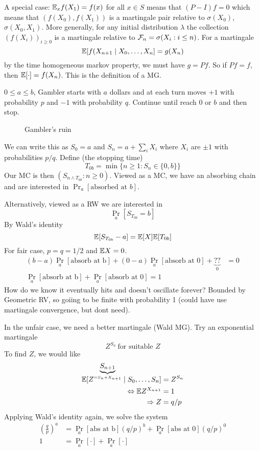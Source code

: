 A special case: $\mathbb{E}_x f(X_1) = f(x)$ for all
$x \in S$ means that $(P - I) f = 0$ which means
that $(f(X_0), f(X_1))$ is a martingale
pair relative to $\sigma(X_0)$, $\sigma(X_0, X_1)$.
More generally, for any initial distribution $\lambda$ the collection $(f(X_i))_{i \geq 0}$
is
a martingale relative to $\mathcal{F}_n = \sigma(X_i : i \leq n)$. For a martingale
\[
  \mathbb{E}[f(X_{n+1} \mid X_0, \ldots, X_n] = g(X_n)
\]
by the time homogeneous markov property, we must
have $g = P f$. So if $P f = f$, then
$\mathbb{E}[\cdot] = f(X_n)$. This is the definition
of a MG.

\begin{example}
  \label{eg:gamblers-ruin}

  $0 \leq a \leq b$, Gambler starts with $a$ dollars
  and at each turn moves $+1$ with probability $p$
  and $-1$ with probability $q$. Continue until
  reach $0$ or $b$ and then stop.

  \begin{figure}[H]
    \centering
    \caption{Gambler's ruin}
    \label{fig:gamblers-ruin}
  \end{figure}

  We can write this as $S_0 = a$ and $S_n = a + \sum_i X_i$ where $X_i$ are $\pm 1$ with probabilities
  $p/q$. Define (the stopping time)
  \[
    T_{0b} = \min\{n \geq 1 : S_n \in \{0,b\}\}
  \]
  Our MC is then $(S_{n \land T_{0b}} : n \geq 0)$.
  Viewed as a MC, we have an absorbing chain and are interested
  in $\Pr_a[\text{absorbed at $b$}]$.

  Alternatively, viewed as a RW we are interested in
  \[
    \Pr_a[S_{T_{0b}} = b]
  \]
  By Wald's identity
  \[
    \mathbb{E}[S_{T_{0b}} - a]
    = \mathbb{E}[X] \mathbb{E}[T_{0b}]
  \]
  For fair case, $p = q = 1/2$ and $\mathbb{E} X = 0$.
  \begin{align*}
    (b-a) \Pr_a[\text{absorb at b}] + (0 - a) \Pr_a[\text{absorb at 0}] + \underbrace{??}_{0} &= 0 \\
    \Pr_a[\text{absorb at b}] + \Pr_a[\text{absorb at 0}] = 1
  \end{align*}
  How do we know it eventually hits and doesn't oscillate forever?
  Bounded by Geometric RV, so goiing to be finite with probability 1
  (could have use martingale convergence, but dont need).

  In the unfair case, we need a better martingale (Wald MG). Try an
  exponential martingale
  \[
    Z^{S_n}~\text{for suitable $Z$}
  \]
  To find $Z$, we would like
  \begin{align*}
    \mathbb{E}[Z^{\underbrace{S_{n+1}}_{=S_n + X_{n+1}}} \mid S_0, \ldots, S_n] &= Z^{S_n} \\
    \Leftrightarrow \mathbb{E} Z^{X_{n+1}} &= 1 \\
    \Rightarrow Z &= q/p
  \end{align*}
  Applying Wald's identity again, we solve the system
  \begin{align*}
    \left(\frac{q}{p} \right)^a &= \Pr_a[\text{abs at b}] (q/p)^b + \Pr_a[\text{abs at 0}](q/p)^0 \\
    1 &= \Pr_a[\cdot] + \Pr_a[\cdot]
  \end{align*}


\end{example}
